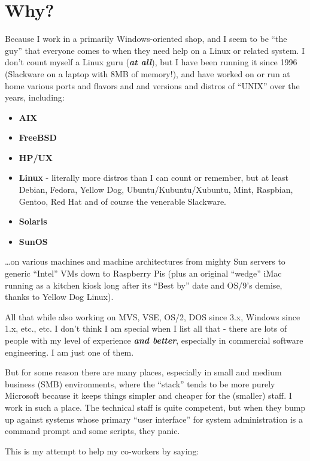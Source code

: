 \documentclass[10pt,]{book}
\numberwithin{figure}{chapter}
\begin{document}
\section{Why?}\label{why}

Because I work in a primarily Windows-oriented shop, and I seem to be
``the guy'' that everyone comes to when they need help on a Linux or
related system. I don't count myself a Linux guru (\textbf{\emph{at
all}}), but I have been running it since 1996 (Slackware on a laptop
with 8MB of memory!), and have worked on or run at home various ports
and flavors and and versions and distros of ``UNIX'' over the years,
including:

\begin{itemize}
\item
  \textbf{AIX}
\item
  \textbf{FreeBSD}
\item
  \textbf{HP/UX}
\item
  \textbf{Linux} - literally more distros than I can count or remember,
  but at least Debian, Fedora, Yellow Dog, Ubuntu/Kubuntu/Xubuntu, Mint,
  Raspbian, Gentoo, Red Hat and of course the venerable Slackware.
\item
  \textbf{Solaris}
\item
  \textbf{SunOS}
\end{itemize}

\ldots{}on various machines and machine architectures from mighty Sun
servers to generic ``Intel'' VMs down to Raspberry Pis (plus an original
``wedge'' iMac running as a kitchen kiosk long after its ``Best by''
date and OS/9's demise, thanks to Yellow Dog Linux).

All that while also working on MVS, VSE, OS/2, DOS since 3.x, Windows
since 1.x, etc., etc. I don't think I am special when I list all that -
there are lots of people with my level of experience \textbf{\emph{and
better}}, especially in commercial software engineering. I am just one
of them.

But for some reason there are many places, especially in small and
medium business (SMB) environments, where the ``stack'' tends to be more
purely Microsoft because it keeps things simpler and cheaper for the
(smaller) staff. I work in such a place. The technical staff is quite
competent, but when they bump up against systems whose primary ``user
interface'' for system administration is a command prompt and some
scripts, they panic.

This is my attempt to help my co-workers by saying:
\end{document}
